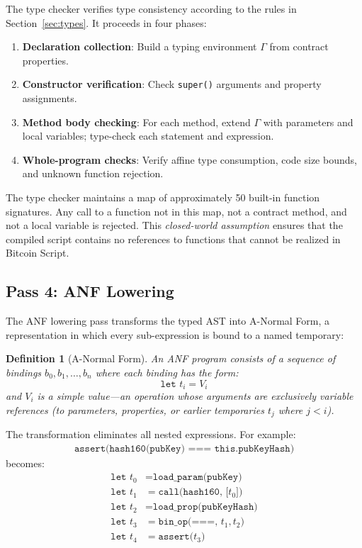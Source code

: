 \documentclass[11pt,a4paper]{article}
\newtheorem{definition}[theorem]{Definition}
\begin{document}
The type checker verifies type consistency according to the rules in
Section~\ref{sec:types}. It proceeds in four phases:

\begin{enumerate}[nosep]
  \item \textbf{Declaration collection}: Build a typing environment $\Gamma$
    from contract properties.
  \item \textbf{Constructor verification}: Check \texttt{super()} arguments
    and property assignments.
  \item \textbf{Method body checking}: For each method, extend $\Gamma$ with
    parameters and local variables; type-check each statement and expression.
  \item \textbf{Whole-program checks}: Verify affine type consumption,
    code size bounds, and unknown function rejection.
\end{enumerate}

The type checker maintains a map of approximately 50 built-in function
signatures. Any call to a function not in this map, not a contract method,
and not a local variable is rejected. This \emph{closed-world assumption}
ensures that the compiled script contains no references to functions that
cannot be realized in Bitcoin Script.

\subsection{Pass 4: ANF Lowering}
\label{sec:pass-anf}

The ANF lowering pass transforms the typed AST into A-Normal Form, a
representation in which every sub-expression is bound to a named temporary:

\begin{definition}[A-Normal Form]
An ANF program consists of a sequence of \emph{bindings} $b_0, b_1, \ldots, b_n$
where each binding has the form:
\[
  \texttt{let } t_i = V_i
\]
and $V_i$ is a \emph{simple value}---an operation whose arguments are
exclusively variable references (to parameters, properties, or earlier
temporaries $t_j$ where $j < i$).
\end{definition}

The transformation eliminates all nested expressions. For example:
\begin{align*}
  \texttt{assert(hash160(pubKey) === this.pubKeyHash)}
\end{align*}
becomes:
\begin{align*}
  \texttt{let } t_0 &= \texttt{load\_param(pubKey)} \\
  \texttt{let } t_1 &= \texttt{call(hash160, [}t_0\texttt{])} \\
  \texttt{let } t_2 &= \texttt{load\_prop(pubKeyHash)} \\
  \texttt{let } t_3 &= \texttt{bin\_op(===, }t_1, t_2\texttt{)} \\
  \texttt{let } t_4 &= \texttt{assert(}t_3\texttt{)}
\end{align*}
\end{document}
